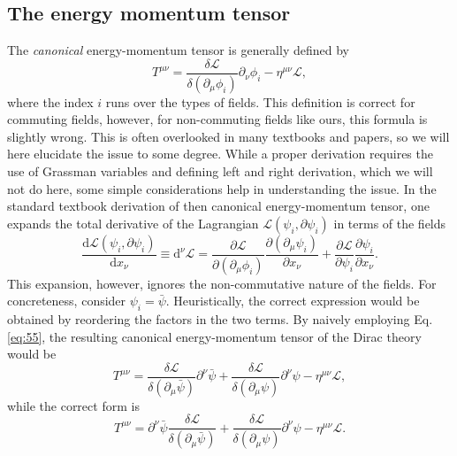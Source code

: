 \subsection{The energy momentum tensor}
The \emph{canonical} energy-momentum tensor is generally defined by
\begin{equation}
  \label{eq:55}
  T^{\mu \nu} =  \frac{\delta \mathcal{L}}{\delta(\partial_{\mu} \phi_{i})} \partial_{\nu} \phi_i - \eta^{\mu \nu} \mathcal{L},
\end{equation}
where the index \( i \) runs over the types of fields.
This definition is correct for commuting fields, however, for non-commuting fields like ours, this formula is slightly wrong.
This is often overlooked in many textbooks and papers, so we will here elucidate the issue to some degree.
While a proper derivation requires the use of Grassman variables and defining left and right derivation, which we will not do here, some simple considerations help in understanding the issue.
In the standard textbook derivation of then canonical energy-momentum tensor, one expands the total derivative of the Lagrangian \( \mathcal{L}(\psi_i, \partial \psi_i)\) in terms of the fields
\begin{equation}
  \label{eq:56}
  \frac{\mathrm{d} \mathcal{L}(\psi_{i}, \partial \psi_i)}{\mathrm{d} x_{\nu }} \equiv \mathrm{d}^{\nu } \mathcal{L}
  = \frac{\partial \mathcal{L}}{\partial (\partial_{\mu } \phi_i)} \frac{\partial(\partial _{\mu } \psi_i)}{\partial x_{\nu }}
  + \frac{\partial \mathcal{L}}{\partial \psi _{i}} \frac{\partial \psi_i}{\partial x_{\nu }}.
\end{equation}
This expansion, however, ignores the non-commutative nature of the fields.
For concreteness, consider \( \psi _i = \bar{\psi} \).
Heuristically, the correct expression would be obtained by reordering the factors in the two terms.
By naively employing Eq. \eqref{eq:55}, the resulting canonical energy-momentum tensor of the Dirac theory would be
\begin{equation}
  T^{\mu \nu} = \frac{\delta \mathcal{L}}{\delta (\partial_{\mu} \bar{\psi})} \partial^{\nu} \bar{\psi}  + \frac{\delta \mathcal{L}}{\delta (\partial_{\mu} \psi)} \partial^{\nu} \psi - \eta^{\mu \nu} \mathcal{L},
\end{equation}
while the correct form is \cite[Eq.~3-153]{itzyksonQuantumFieldTheory1980}
\begin{equation}
  \label{eq:57}
  T^{\mu \nu} = \partial^{\nu} \bar{\psi} \frac{\delta \mathcal{L}}{\delta (\partial_{\mu} \bar{\psi})} + \frac{\delta \mathcal{L}}{\delta (\partial_{\mu} \psi)} \partial^{\nu} \psi - \eta^{\mu \nu} \mathcal{L}.
\end{equation}

